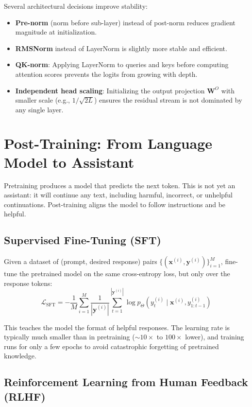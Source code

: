 \documentclass[main.tex]{subfiles}
\begin{document}
Several architectural decisions improve stability:
\begin{itemize}
    \item \textbf{Pre-norm} (norm before sub-layer) instead of post-norm reduces gradient magnitude at initialization.
    \item \textbf{RMSNorm} instead of LayerNorm is slightly more stable and efficient.
    \item \textbf{QK-norm}: Applying LayerNorm to queries and keys before computing attention scores prevents the logits from growing with depth.
    \item \textbf{Independent head scaling}: Initializing the output projection $\mathbf{W}^O$ with smaller scale (e.g., $1/\sqrt{2L}$) ensures the residual stream is not dominated by any single layer.
\end{itemize}

\needspace{0.33\textheight}
\section{Post-Training: From Language Model to Assistant}

Pretraining produces a model that predicts the next token. This is not yet an assistant: it will continue any text, including harmful, incorrect, or unhelpful continuations. Post-training aligns the model to follow instructions and be helpful.

\subsection{Supervised Fine-Tuning (SFT)}

Given a dataset of (prompt, desired response) pairs $\{(\mathbf{x}^{(i)}, \mathbf{y}^{(i)})\}_{i=1}^{M}$, fine-tune the pretrained model on the same cross-entropy loss, but only over the response tokens:
$$\mathcal{L}_{\text{SFT}} = -\frac{1}{M}\sum_{i=1}^{M}\frac{1}{|\mathbf{y}^{(i)}|}\sum_{t=1}^{|\mathbf{y}^{(i)}|}\log p_\Theta\!\left(y_t^{(i)} \mid \mathbf{x}^{(i)}, y_{1:t-1}^{(i)}\right)$$

This teaches the model the format of helpful responses. The learning rate is typically much smaller than in pretraining ($\sim\!10\times$ to $100\times$ lower), and training runs for only a few epochs to avoid catastrophic forgetting of pretrained knowledge.

\subsection{Reinforcement Learning from Human Feedback (RLHF)}
\end{document}

